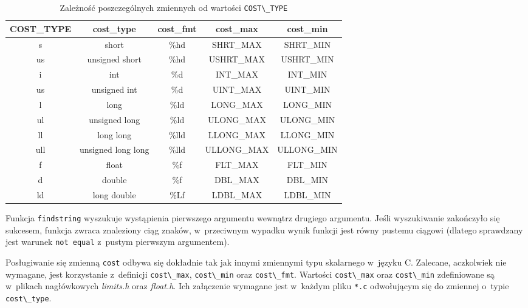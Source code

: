 \documentclass[a4paper,12pt,polish,twoside,openright]{thesis}
\newcommand\code[1]{\lstinline[style=line]{#1}}
\begin{document}
\begin{table}[htb]
\caption{Zależność poszczególnych zmiennych od wartości \code{COST\_TYPE}}
\label{tab:dep}
\begin{tabular}{ | c | c | c | c | c | }
	\hline
	COST\_TYPE  & cost\_type            & cost\_fmt  & cost\_max      & cost\_min      \\
	\hline \hline
	s           & short                 & \%hd       & SHRT\_MAX      & SHRT\_MIN      \\ \hline
	us          & unsigned short        & \%hd       & USHRT\_MAX     & USHRT\_MIN     \\ \hline
	i           & int                   & \%d        & INT\_MAX       & INT\_MIN       \\ \hline
	us          & unsigned int          & \%d        & UINT\_MAX      & UINT\_MIN      \\ \hline
	l           & long                  & \%ld       & LONG\_MAX      & LONG\_MIN      \\ \hline
	ul          & unsigned long         & \%ld       & ULONG\_MAX     & ULONG\_MIN     \\ \hline
	ll          & long long             & \%lld      & LLONG\_MAX     & LLONG\_MIN     \\ \hline
	ull         & unsigned long long    & \%lld      & ULLONG\_MAX    & ULLONG\_MIN    \\ \hline
	f           & float                 & \%f        & FLT\_MAX       & FLT\_MIN       \\ \hline
	d           & double                & \%f        & DBL\_MAX       & DBL\_MIN       \\ \hline
	ld          & long double           & \%Lf       & LDBL\_MAX      & LDBL\_MIN      \\ \hline
\end{tabular}
\end{table}

Funkcja \code{findstring} wyszukuje wystąpienia pierwszego argumentu wewnątrz drugiego argumentu.
Jeśli wyszukiwanie zakończyło się sukcesem, funkcja zwraca znaleziony ciąg znaków, w~przeciwnym wypadku wynik funkcji jest równy pustemu ciągowi (dlatego sprawdzany jest warunek \code{not equal} z~pustym pierwszym argumentem).

Posługiwanie się zmienną \code{cost} odbywa się dokładnie tak jak innymi zmiennymi typu skalarnego w~języku C.
Zalecane, aczkolwiek nie wymagane, jest korzystanie z~definicji \code{cost\_max}, \code{cost\_min} oraz \code{cost\_fmt}.
Wartości \code{cost\_max} oraz \code{cost\_min} zdefiniowane są w~plikach nagłówkowych \emph{limits.h} oraz \emph{float.h}. Ich załączenie wymagane jest w~każdym pliku \code{*.c} odwołującym się do zmiennej o~typie \code{cost\_type}.
\end{document}
